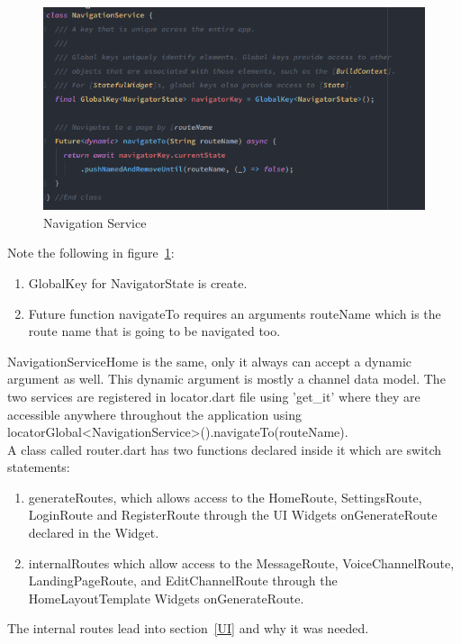 \begin{figure}[h!]
    \caption{Navigation Service}
    \label{image:navService}
    \centering
    \includegraphics[width=1.0\textwidth]{images/navigation_service_class.png}
\end{figure}

Note the following in figure~\ref{image:navService}:
\begin{enumerate}
    \item GlobalKey for NavigatorState is create.
    \item Future function navigateTo requires an arguments routeName which is the route name that is going to be navigated too.
\end{enumerate}

NavigationServiceHome is the same, only it always can accept a dynamic argument as well. This dynamic argument is mostly a channel data model. The two services are registered in locator.dart file using 'get\_it' where they are accessible anywhere throughout the application using locatorGlobal<NavigationService>().navigateTo(routeName).
\\ A class called router.dart has two functions declared inside it which are switch statements:
\begin{enumerate}
    \item generateRoutes, which allows access to the HomeRoute, SettingsRoute, LoginRoute and RegisterRoute through the UI Widgets onGenerateRoute declared in the Widget.
    \item internalRoutes which allow access to the MessageRoute, VoiceChannelRoute, LandingPageRoute, and EditChannelRoute through the HomeLayoutTemplate Widgets onGenerateRoute.
\end{enumerate}
The internal routes lead into section~\ref{UI} and why it was needed.

